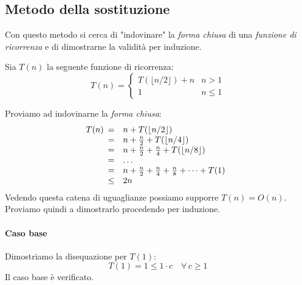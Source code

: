 \subsection{Metodo della sostituzione}
Con questo metodo si cerca di "indovinare" la \emph{forma chiusa} di una
\emph{funzione di ricorrenza} e di dimostrarne la validità per induzione.

\begin{eg}
    Sia $T(n)$ la seguente funzione di ricorrenza:
    \[T(n)=\begin{cases}
        T(\lfloor n/2\rfloor)+n & n>1\\
        1 & n\leq1
    \end{cases}\]

    \bigskip\noindent
    Proviamo ad indovinarne la \emph{forma chiusa}:
    \[T(n)\begin{array}[t]{cl}
        = & n + T(\lfloor n/2\rfloor)\\
        = & n + \frac{n}{2} + T(\lfloor n/4\rfloor)\\
        = & n + \frac{n}{2} + \frac{n}{4} + T(\lfloor n/8\rfloor)\\
        = & \dots\\
        = & n + \frac{n}{2} + \frac{n}{4} + \frac{n}{8} + \dots + T(1)\\
        \leq & 2n
    \end{array}\]
    Vedendo questa catena di uguaglianze possiamo supporre $T(n)=O(n)$. Proviamo
    quindi a dimostrarlo procedendo per induzione.

    \paragraph{Caso base} Dimostriamo la disequazione per $T(1)$:
    \[T(1)=1\leq1\cdot c\quad\forall\,c\geq1\]
    Il caso base è verificato.


\end{eg}
